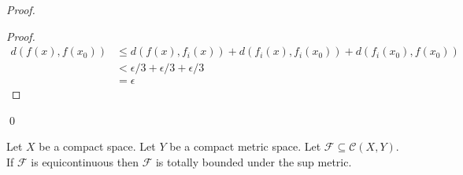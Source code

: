 \begin{proof}
    \pf
    \begin{proof}
        \pf
        \begin{align*}
            d(f(x),f(x_0)) & \leq d(f(x),f_i(x)) + d(f_i(x),f_i(x_0)) + d(f_i(x_0),f(x_0)) \\
            & < \epsilon / 3 + \epsilon / 3 + \epsilon / 3 \\
            & = \epsilon
        \end{align*}
    \end{proof}
    \qed
\end{proof}

\begin{lemma}[Choice]
    \label{lemma:equicontinuous_totally_bounded}
    Let $X$ be a compact space. Let $Y$ be a compact metric space. Let $\mathcal{F} \subseteq \mathcal{C}(X,Y)$. If $\mathcal{F}$
    is equicontinuous then $\mathcal{F}$ is totally bounded under the sup metric.
\end{lemma}

